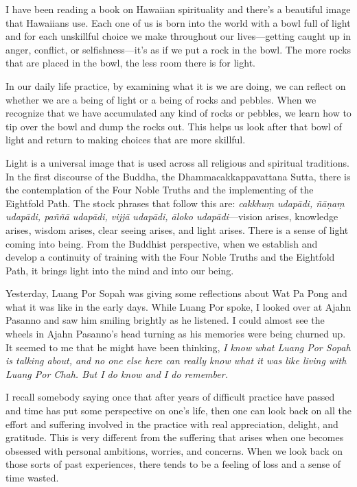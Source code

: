 I have been reading a book on Hawaiian spirituality and there's a 
beautiful image that Hawaiians use. Each one of us is born into the 
world with a bowl full of light and for each unskillful choice we make 
throughout our lives---getting caught up in anger, conflict, or 
selfishness---it's as if we put a rock in the bowl. The more rocks that 
are placed in the bowl, the less room there is for light.

In our daily life practice, by examining what it is we are doing, we 
can reflect on whether we are a being of light or a being of rocks and 
pebbles. When we recognize that we have accumulated any kind of rocks 
or pebbles, we learn how to tip over the bowl and dump the rocks out. 
This helps us look after that bowl of light and return to making 
choices that are more skillful.

Light is a universal image that is used across all religious and 
spiritual traditions. In the first discourse of the Buddha, the 
Dhammacakkappavattana Sutta, there is the contemplation of the Four 
Noble Truths and the implementing of the Eightfold Path. The stock 
phrases that follow this are: \emph{cakkhuṃ udapādi, ñāṇaṃ 
udapādi, paññā udapādi, vijjā udapādi, āloko udapādi}---vision 
arises, knowledge arises, wisdom arises, clear seeing arises, and light 
arises. There is a sense of light coming into being. From the Buddhist 
perspective, when we establish and develop a continuity of training 
with the Four Noble Truths and the Eightfold Path, it brings light into 
the mind and into our being.


Yesterday, Luang Por Sopah was giving some reflections about Wat Pa 
Pong and what it was like in the early days. While Luang Por spoke, I 
looked over at Ajahn Pasanno and saw him smiling brightly as he 
listened. I could almost see the wheels in Ajahn Pasanno's head turning 
as his memories were being churned up. It seemed to me that he might 
have been thinking, \emph{I know what Luang Por Sopah is talking about, 
and no one else here can really know what it was like living with Luang 
Por Chah. But I do know and I do remember.}

I recall somebody saying once that after years of difficult practice 
have passed and time has put some perspective on one's life, then one 
can look back on all the effort and suffering involved in the practice 
with real appreciation, delight, and gratitude. This is very different 
from the suffering that arises when one becomes obsessed with personal 
ambitions, worries, and concerns. When we look back on those sorts of 
past experiences, there tends to be a feeling of loss and a sense of 
time wasted.

